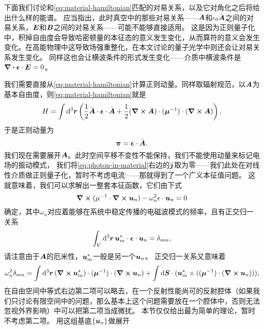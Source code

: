 \documentclass[UTF8, a4paper]{ctexart}
\begin{document}
下面我们讨论和\eqref{eq:material-hamiltonian}匹配的对易关系，以及它对角化之后将给出什么样的能谱。
应当指出，此时真空中的那些对易关系——$\vb*{A}$和$\epsilon_0 \dot{\vb*{A}}$之间的对易关系，$\vb*{E}$和$\vb*{B}$之间的对易关系——可能不能够直接适用。
这是因为正则量子化中，积掉自由度会导致哈密顿量的本征态的意义发生变化，从而算符的意义会发生变化。在高能物理中这导致场强重整化，在本文讨论的量子光学中则还会让对易关系发生变化。
同样这也会让横波条件的形式发生变化——介质中横波条件是$\div{\vb*{\epsilon} \cdot \vb*{E}} = 0$。

我们需要直接从\eqref{eq:material-hamiltonian}计算正则动量。同样取辐射规范，以$\vb*{A}$为基本自由度，则\eqref{eq:material-hamiltonian}就是
\begin{equation}
    H = \int \dd[3]{\vb*{r}} \left( \frac{1}{2} \dot{\vb*{A}} \cdot \vb*{\epsilon} \cdot \dot{\vb*{A}} + \frac{1}{2} (\curl{\vb*{A}}) \cdot (\vb*{\mu}^{-1}) \cdot (\curl{\vb*{A}}) \right),
\end{equation}
于是正则动量为
\begin{equation}
    \vb*{\pi} = \vb*{\epsilon} \cdot \dot{\vb*{\vb*{A}}}.
\end{equation}
我们现在需要展开$\vb*{A}$。此时空间平移不变性不能保持，我们不能使用动量来标记电场的振动模式，
我们将\eqref{eq:photon-in-material}右边的$\vb*{j}$取为零——我们此处在对线性介质做正则量子化，暂时不考虑电流——那就得到了一个广义本征值问题。
这就意味着，我们可以求解出一整套本征函数，它们由下式
\begin{equation}
    \curl{(\mu^{-1} \cdot \curl{\vb*{u}_n})} - \omega_n^2 \epsilon \cdot \vb*{u}_n = 0
\end{equation}
确定，其中$\omega_n$对应着能够在系统中稳定传播的电磁波模式的频率，且有正交归一关系
\begin{equation}
    \int_V \dd[3]{\vb*{r}} \vb*{u}^*_m \cdot \vb*{\epsilon} \cdot \vb*{u}_n = \delta_{mn}, 
\end{equation}
请注意由于$\vb*{A}$的厄米性，$\vb*{u}_m^*$一般是另一个$\vb*{u}_n$。
正交归一关系又意味着
\begin{equation}
    \omega_n^2 \delta_{mn} = \int \dd[3]{\vb*{r}} (\curl{\vb*{u}_m^*}) \cdot (\vb*{\mu}^{-1}) \cdot (\curl{\vb*{u}_n}) + \int \dd{\vb*{S}} \cdot (\vb*{u}_m^* \times ((\vb*{\mu}^{-1}) \cdot (\curl{\vb*{u}_n}))),
\end{equation}
在自由空间中等式右边第二项可以略去，在一个反射性能尚可的反射腔体（如果我们只讨论有限空间中的问题，那么基本上这个问题需要放在一个腔体中，否则无法忽视外界影响）中可以把第二项当成微扰。
本节仅仅给出最为简单的理论，暂时不考虑第二项。
用这组基底$\{\vb*{u}_n\}$做展开
\end{document}
